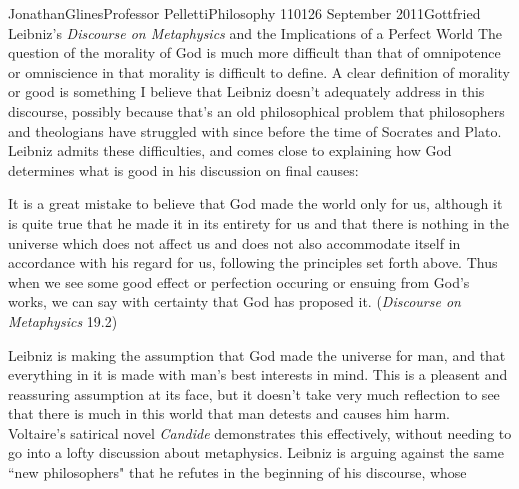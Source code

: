 \documentclass[12pt,letterpaper]{article}
\begin{document}
\begin{mla}{Jonathan}{Glines}{Professor Pelletti}{Philosophy 1101}{26 September 2011}{Gottfried Leibniz's \textit{Discourse on Metaphysics} and the Implications of a Perfect World}
The question of the morality of God is much more difficult than that of omnipotence or omniscience in that morality is difficult to define. A clear definition of morality or good is something I believe that Leibniz doesn't adequately address in this discourse, possibly because that's an old philosophical problem that philosophers and theologians have struggled with since before the time of Socrates and Plato. Leibniz admits these difficulties, and comes close to explaining how God determines what is good in his discussion on final causes:
\begin{mlaquote}
It is a great mistake to believe that God made the world only for us, although it is quite true that he made it in its entirety for us and that there is nothing in the universe which does not affect us and does not also accommodate itself in accordance with his regard for us, following the principles set forth above. Thus when we see some good effect or perfection occuring or ensuing from God's works, we can say with certainty that God has proposed it. (\textit{Discourse on Metaphysics} 19.2)
\end{mlaquote}
Leibniz is making the assumption that God made the universe for man, and that everything in it is made with man's best interests in mind. This is a pleasent and reassuring assumption at its face, but it doesn't take very much reflection to see that there is much in this world that man detests and causes him harm. Voltaire's satirical novel \textit{Candide} demonstrates this effectively, without needing to go into a lofty discussion about metaphysics. Leibniz is arguing against the same ``new philosophers" that he refutes in the beginning of his discourse, whose 


\end{mla}
\end{document}
